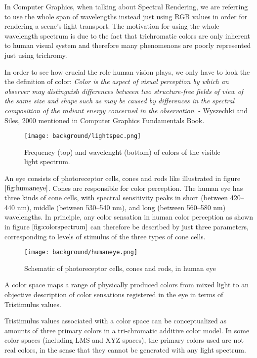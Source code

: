 In Computer Graphics, when talking about Spectral Rendering, we are referring to use the whole span of wavelengths instead just using RGB values in order for rendering a scene's light transport. The motivation for using the whole wavelength spectrum is due to the fact that trichromatic colors are only inherent to human visual system and therefore many phenomenons are poorly represented just using trichromy. 

\label{subsec:colors}
In order to see how crucial the role human vision plays, we only have to look the the definition of color: 
\textit{Color is the aspect of visual perception by which an observer may distinguish differences between two structure-free fields of view of the same size and shape such as may be caused by differences in the spectral composition of the radiant energy concerned in the observation}. - Wyszechki and Siles, 2000 mentioned in Computer Graphics Fundamentals Book. 

\begin{figure}[H]
  \centering
  \texttt{[image: background/lightspec.png]}
  \caption{Frequency (top) and wavelenght (bottom) of colors of the visible light spectrum.}
  \label{fig:colorspectrum}
\end{figure}

An eye consists of photoreceptor cells, cones and rods like illustrated in figure $\ref{fig:humaneye}$. Cones are responsible for color perception. 
The human eye has three kinds of cone cells, with spectral sensitivity peaks in short (between 420–440 nm), middle (between 530–540 nm), and long (between 560–580 nm) wavelengths.
In principle, any color sensation in human color perception as shown in figure $\ref{fig:colorspectrum}$ can therefore be described by just three parameters, corresponding to levels of stimulus of the three types of cone cells.

\begin{figure}[H]
  \centering
  \texttt{[image: background/humaneye.png]}
  \caption{Schematic of photoreceptor cells, cones and rods, in human eye }
  \label{fig:humaneye}
\end{figure}

A color space maps a range of physically produced colors from mixed light to an objective description of color
sensations registered in the eye in terms of Tristimulus values.

Tristimulus values associated with a color space can be conceptualized as amounts of three primary colors in a tri-chromatic additive color model. In some color spaces (including LMS and XYZ spaces), the primary colors used are not real colors, in the sense that they cannot be generated with any light spectrum.

